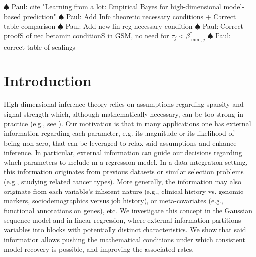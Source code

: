\documentclass[bj,authoryear]{imsart}
\theoremstyle{plain}
\newcommand{\paul}[1]{{\small{\color{green} \sf $\spadesuit$ Paul: #1}}}
\begin{document}
\paul{cite "Learning from a lot: Empirical Bayes for
high-dimensional model-based prediction"}
\paul{Add Info theoretic necessary conditions + Correct table comparison}
\paul{Add new lin reg necessary condition}
\paul{Correct proofS of nec betamin conditionS in GSM, no need for $\tau_j<\beta_{\min,j}^*$}
\paul{correct table of scalings}
\section{Introduction} 

High-dimensional inference theory relies on assumptions regarding sparsity and signal strength which,
although mathematically necessary, can be too strong in practice (e.g., see \cite{giannone2021economic}).
Our motivation is that in many applications one has external information regarding each parameter, e.g. its magnitude or its likelihood of being non-zero, that can be leveraged to relax said assumptions and enhance inference.
In particular, external information can guide our decisions regarding which parameters to include in a regression model. 
In a data integration setting, this information originates from previous datasets or similar selection problems (e.g., studying related cancer types). More generally, the information may also originate from each variable's inherent nature (e.g., clinical history vs. genomic markers, sociodemographics versus job history), or meta-covariates (e.g., functional annotations on genes), etc.
We investigate this concept in the Gaussian sequence model and in linear regression, where external information partitions variables into blocks with potentially distinct characteristics. We show that said information allows pushing the mathematical conditions under which consistent model recovery is possible, and improving the associated rates.
\end{document}
